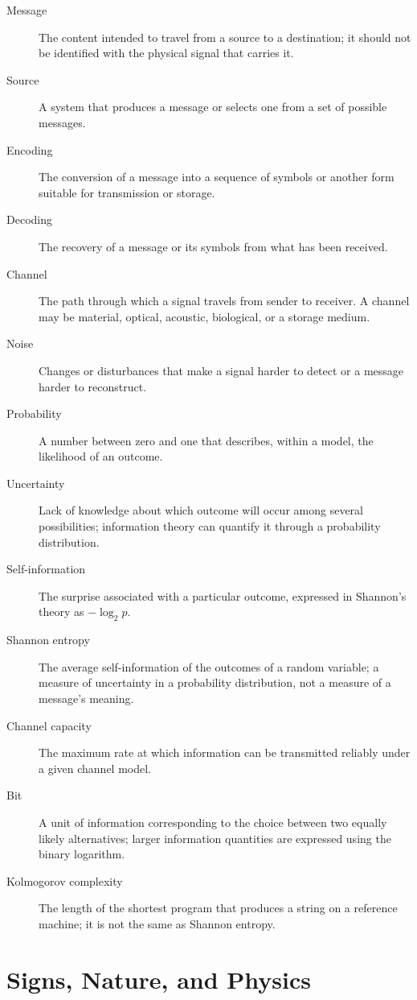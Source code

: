 \begin{description}
  \item[Message] The content intended to travel from a source to a destination; it should not be identified with the physical signal that carries it.
  \item[Source] A system that produces a message or selects one from a set of possible messages.
  \item[Encoding] The conversion of a message into a sequence of symbols or another form suitable for transmission or storage.
  \item[Decoding] The recovery of a message or its symbols from what has been received.
  \item[Channel] The path through which a signal travels from sender to receiver. A channel may be material, optical, acoustic, biological, or a storage medium.
  \item[Noise] Changes or disturbances that make a signal harder to detect or a message harder to reconstruct.
  \item[Probability] A number between zero and one that describes, within a model, the likelihood of an outcome.
  \item[Uncertainty] Lack of knowledge about which outcome will occur among several possibilities; information theory can quantify it through a probability distribution.
  \item[Self-information] The surprise associated with a particular outcome, expressed in Shannon's theory as \(-\log_2 p\).
  \item[Shannon entropy] The average self-information of the outcomes of a random variable; a measure of uncertainty in a probability distribution, not a measure of a message's meaning.
  \item[Channel capacity] The maximum rate at which information can be transmitted reliably under a given channel model.
  \item[Bit] A unit of information corresponding to the choice between two equally likely alternatives; larger information quantities are expressed using the binary logarithm.
  \item[Kolmogorov complexity] The length of the shortest program that produces a string on a reference machine; it is not the same as Shannon entropy.
\end{description}

\section*{Signs, Nature, and Physics}

